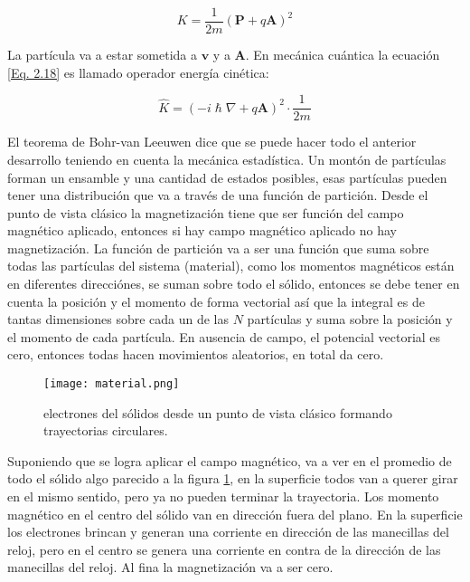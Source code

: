 \documentclass[11pt,fleqn]{book}
\renewcommand{\vec}[1]{\mathbf{#1}}
\begin{document}
\begin{equation}
    K=\frac{1}{2m}\left(\vec{P}+q\vec{A}\right)^{2}
    \label{Eq. 2.18}
\end{equation}

La partícula va a estar sometida a $\vec{v}$ y a $\vec{A}$. En mecánica cuántica la ecuación \ref{Eq. 2.18} es llamado operador energía cinética:

\begin{equation}
    \hat{K}=\left(-i\hslash\nabla+q\vec{A}\right)^{2}\cdot\frac{1}{2m}
    \label{Eq. 2.19}
\end{equation}

El teorema de Bohr-van Leeuwen dice que se puede hacer todo el anterior desarrollo teniendo en cuenta la mecánica estadística. Un montón de partículas forman un ensamble y una cantidad de estados posibles, esas partículas pueden tener una distribución que va a través de una función de partición. Desde el punto de vista clásico la magnetización tiene que ser función del campo magnético aplicado, entonces si hay campo magnético aplicado no hay magnetización. La función de partición va a ser una función que suma sobre todas las partículas del sistema (material), como los momentos magnéticos están en diferentes direcciónes, se suman sobre todo el sólido, entonces se debe tener en cuenta la posición y el momento de forma vectorial así que la integral es de tantas dimensiones sobre cada un de las $N$ partículas y suma sobre la posición y el momento de cada partícula. En ausencia de campo, el potencial vectorial es cero, entonces todas hacen movimientos aleatorios, en total da cero.

\begin{figure}[H]
    \centering
    \texttt{[image: material.png]}
    \caption{electrones del sólidos desde un punto de vista clásico formando trayectorias circulares.}
    \label{Fig. 2.6}
\end{figure}

Suponiendo que se logra aplicar el campo magnético, va a ver en el promedio de todo el sólido algo parecido a la figura \ref{Fig. 2.6}, en la superficie todos van a querer girar en el mismo sentido, pero ya no pueden terminar la trayectoria. Los momento magnético en el centro del sólido van en dirección fuera del plano. En la superficie los electrones brincan y generan una corriente en dirección de las manecillas del reloj, pero en el centro se genera una corriente en contra de la dirección de las manecillas del reloj. Al fina la magnetización va a ser cero.
\end{document}
